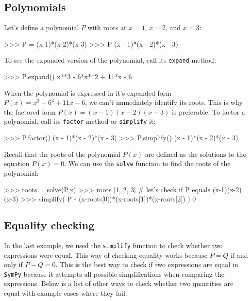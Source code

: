 \subsection{Polynomials}
\label{basics:polynomials}

Let's define a polynomial $P$ with roots at $x=1$, $x=2$, and $x=3$:											

\small
\begin{verbatimtab}
>>> P = (x-1)*(x-2)*(x-3)
>>> P
(x - 1)*(x - 2)*(x - 3)
\end{verbatimtab}
\normalsize

\noindent
To see the expanded version of the polynomial,
call its \texttt{expand} method:																			

\small
\begin{verbatimtab}
>>> P.expand()
x**3 - 6*x**2 + 11*x - 6
\end{verbatimtab}
\normalsize

\noindent
When the polynomial is expressed in it's expanded form $P(x)=x^3-6^2 + 11x - 6$,
we can't immediately identify its roots.
This is why the factored form $P(x)=(x-1)(x-2)(x-3)$ is preferable.
To factor a polynomial,
call its \texttt{factor} method or \texttt{simplify} it:															

\small
\begin{verbatimtab}
>>> P.factor()
(x - 1)*(x - 2)*(x - 3)
>>> P.simplify()
(x - 1)*(x - 2)*(x - 3)
\end{verbatimtab}
\normalsize

\noindent
Recall that the roots of the polynomial $P(x)$ are defined as the solutions to the equation $P(x)=0$.
We can use the \texttt{solve} function to find the roots of the polynomial:

\small
\begin{verbatimtab}
>>> roots = solve(P,x)
>>> roots
[1, 2, 3]
# let's check if P equals (x-1)(x-2)(x-3)
>>> simplify( P  -  (x-roots[0])*(x-roots[1])*(x-roots[2]) )   
0  
\end{verbatimtab}
\normalsize


\subsection{Equality checking}
\label{basics:equality_checking}

In the last example, we used the \texttt{simplify} function to check whether two expressions were equal.
This way of checking equality works because $P=Q$ if and only if $P-Q=0$.
This is the best way to check if two expressions are equal in \texttt{SymPy}
because it attempts all possible simplifications when comparing the expressions.
Below is a list of other ways to check whether two quantities are equal
with example cases where they fail:

